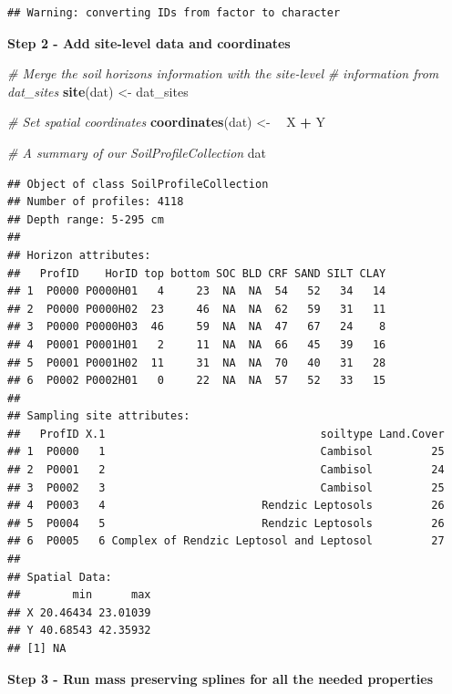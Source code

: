 \documentclass[10pt,b5paper,]{book}
\newenvironment{Shaded}{\begin{snugshade}}{\end{snugshade}}
\newcommand{\CommentTok}[1]{\textcolor[rgb]{0.56,0.35,0.01}{\textit{#1}}}
\newcommand{\ErrorTok}[1]{\textcolor[rgb]{0.64,0.00,0.00}{\textbf{#1}}}
\newcommand{\KeywordTok}[1]{\textcolor[rgb]{0.13,0.29,0.53}{\textbf{#1}}}
\newcommand{\NormalTok}[1]{#1}
\newcommand{\OperatorTok}[1]{\textcolor[rgb]{0.81,0.36,0.00}{\textbf{#1}}}
\newcommand{\StringTok}[1]{\textcolor[rgb]{0.31,0.60,0.02}{#1}}
\theoremstyle{definition}
\theoremstyle{definition}
\theoremstyle{definition}
\theoremstyle{remark}
\begin{document}
\begin{verbatim}
## Warning: converting IDs from factor to character
\end{verbatim}

\textbf{Step 2 - Add site-level data and coordinates}

\begin{Shaded}
\begin{Highlighting}[]
\CommentTok{# Merge the soil horizons information with the site-level }
\CommentTok{# information from dat_sites}
\KeywordTok{site}\NormalTok{(dat) <-}\StringTok{ }\NormalTok{dat_sites}

\CommentTok{# Set spatial coordinates}
\KeywordTok{coordinates}\NormalTok{(dat) <-}\StringTok{ }\ErrorTok{~}\StringTok{ }\NormalTok{X }\OperatorTok{+}\StringTok{ }\NormalTok{Y}

\CommentTok{# A summary of our SoilProfileCollection}
\NormalTok{dat}
\end{Highlighting}
\end{Shaded}

\begin{verbatim}
## Object of class SoilProfileCollection
## Number of profiles: 4118
## Depth range: 5-295 cm
## 
## Horizon attributes:
##   ProfID    HorID top bottom SOC BLD CRF SAND SILT CLAY
## 1  P0000 P0000H01   4     23  NA  NA  54   52   34   14
## 2  P0000 P0000H02  23     46  NA  NA  62   59   31   11
## 3  P0000 P0000H03  46     59  NA  NA  47   67   24    8
## 4  P0001 P0001H01   2     11  NA  NA  66   45   39   16
## 5  P0001 P0001H02  11     31  NA  NA  70   40   31   28
## 6  P0002 P0002H01   0     22  NA  NA  57   52   33   15
## 
## Sampling site attributes:
##   ProfID X.1                                 soiltype Land.Cover
## 1  P0000   1                                 Cambisol         25
## 2  P0001   2                                 Cambisol         24
## 3  P0002   3                                 Cambisol         25
## 4  P0003   4                        Rendzic Leptosols         26
## 5  P0004   5                        Rendzic Leptosols         26
## 6  P0005   6 Complex of Rendzic Leptosol and Leptosol         27
## 
## Spatial Data:
##        min      max
## X 20.46434 23.01039
## Y 40.68543 42.35932
## [1] NA
\end{verbatim}

\textbf{Step 3 - Run mass preserving splines for all the needed
properties}
\end{document}

